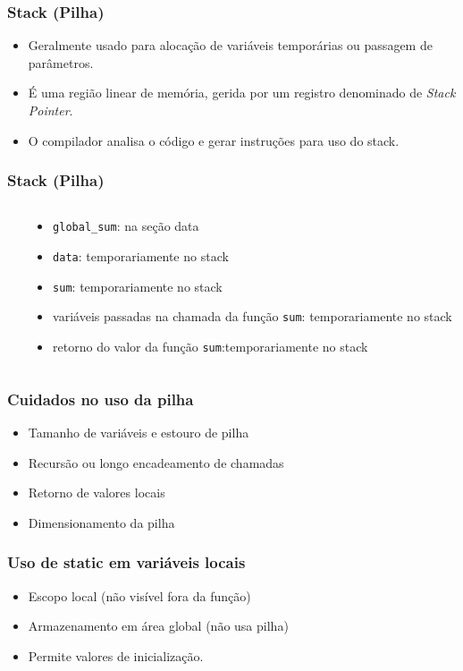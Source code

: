 \documentclass{beamer}
\begin{document}
\begin{frame}
	\frametitle{Stack (Pilha)}
	\begin{itemize}
		\item Geralmente usado para alocação de variáveis temporárias ou passagem de parâmetros.
		\item É uma região linear de memória, gerida por um registro denominado de \textit{Stack Pointer}.
		\item O compilador analisa o código e gerar instruções para uso do stack.
	\end{itemize}
\end{frame}

\begin{frame}
	\frametitle{Stack (Pilha)}
	\begin{columns}[T] %
	\begin{column}{.60\textwidth}
		
	\end{column}%
	\hfill%
    \pause
	\begin{column}{.40\textwidth}
    {\footnotesize
	\begin{itemize}
	\item \texttt{global\_sum}: na seção data
    \item \texttt{data}: temporariamente no stack
    \item \texttt{sum}: temporariamente no stack
    \item variáveis passadas na chamada da função \texttt{sum}: temporariamente no stack
    \item retorno do valor da função \texttt{sum}:temporariamente  no stack
	\end{itemize}
    }
	\end{column}%
\end{columns}
\end{frame}

\begin{frame}
	\frametitle{Cuidados no uso da pilha}
	\begin{itemize}
	\item Tamanho de variáveis e estouro de pilha
	\item Recursão ou longo encadeamento de chamadas
	\item Retorno de valores locais
	\item Dimensionamento da pilha
	\end{itemize}
\end{frame}

\begin{frame}
	\frametitle{Uso de static em variáveis locais}
	\begin{itemize}
	\item Escopo local (não visível fora da função)
	\item Armazenamento em área global (não usa pilha)
	\item Permite valores de inicialização.
	\end{itemize}
\end{frame}
\end{document}
